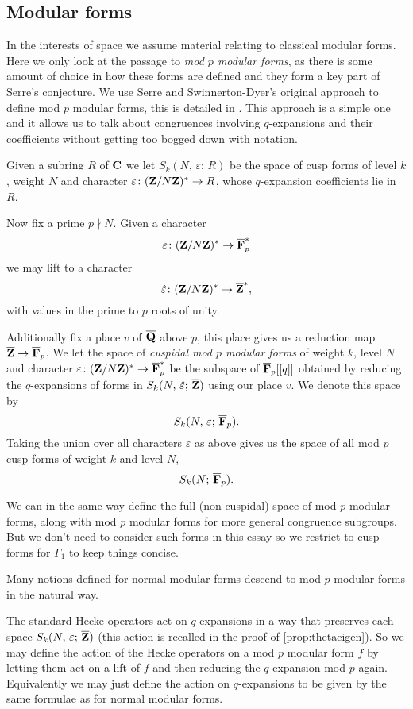 \documentclass[a4paper,12pt]{article}
\begin{document}
\subsection{Modular forms}
In the interests of space we assume material relating to classical modular forms.
Here we only look at the passage to \emph{mod $p$ modular forms}, as there is some amount of choice in how these forms are defined and they form a key part of Serre's conjecture.
We use Serre and Swinnerton-Dyer's original approach to define mod $p$ modular forms, this is detailed in \cite{SD,Serre73,Serre73Formes}.
This approach is a simple one and it allows us to talk about congruences involving $q$-expansions and their coefficients without getting too bogged down with notation.

\begin{defn}
Given a subring $R$ of $\mathbf{C}$ we let $S_k(N,\,\varepsilon;\,R)$ be the space of cusp forms of level $k$, weight $N$ and character $\varepsilon\colon (\mathbf{Z}/N\mathbf{Z})^* \to R$, whose $q$-expansion coefficients lie in $R$.

Now fix a prime $p\nmid N$.
Given a character
\[
\varepsilon\colon (\mathbf{Z}/N\mathbf{Z})^* \to \overline{\mathbf{F}}_p^*
\]
we may lift to a character
\[
\hat{\varepsilon}\colon (\mathbf{Z}/N\mathbf{Z})^* \to \overline{\mathbf{Z}}^*,
\]
with values in the prime to $p$ roots of unity.

Additionally fix a place $v$ of $\overline{\mathbf{Q}}$ above $p$, this place gives us a reduction map $\overline{\mathbf{Z}} \to \overline{\mathbf{F}}_p$.
We let the space of \emph{cuspidal mod $p$ modular forms} of weight $k$, level $N$ and character $\varepsilon\colon (\mathbf{Z}/N\mathbf{Z})^* \to \overline{\mathbf{F}}_p^*$ be the subspace of $\overline{\mathbf{F}}_p[[q]]$ obtained by reducing the $q$-expansions of forms in $S_k(N,\,\hat{\varepsilon};\,\overline{\mathbf{Z}})$ using our place $v$.
We denote this space by
\[
S_k(N,\,\varepsilon;\,\overline{\mathbf{F}}_p).
\]
Taking the union over all characters $\varepsilon$ as above gives us the space of all mod $p$ cusp forms of weight $k$ and level $N$,
\[
S_k(N;\,\overline{\mathbf{F}}_p).
\]

We can in the same way define the full (non-cuspidal) space of mod $p$ modular forms, along with mod $p$ modular forms for more general congruence subgroups.
But we don't need to consider such forms in this essay so we restrict to cusp forms for $\Gamma_1$ to keep things concise.
\end{defn}

Many notions defined for normal modular forms descend to mod $p$ modular forms in the natural way.

\begin{defn}
The standard Hecke operators act on $q$-expansions in a way that preserves each space $S_k(N,\,\varepsilon;\,\overline{\mathbf{Z}})$ (this action is recalled in the proof of \cref{prop:thetaeigen}).
So we may define the action of the Hecke operators on a mod $p$ modular form $f$ by letting them act on a lift of $f$ and then reducing the $q$-expansion mod $p$ again.
Equivalently we may just define the action on $q$-expansions to be given by the same formulae as for normal modular forms.
\end{defn}
\end{document}
